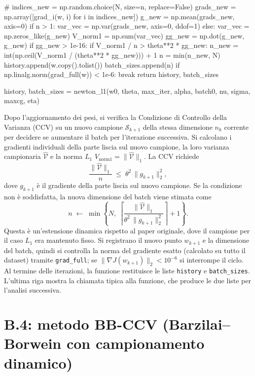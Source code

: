 \documentclass[italian, a4paper, twoside, binding=6mm]{sapthesis}
\begin{document}
\begin{pythoncode}[title= Newton-L1]

#
        indices_new = np.random.choice(N, size=n, replace=False)
        grads_new = np.array([grad_i(w, i) for i in indices_new])
        g_new = np.mean(grads_new, axis=0)
        if n > 1:
            var_vec = np.var(grads_new, axis=0, ddof=1)
        else:
            var_vec = np.zeros_like(g_new)
        V_norm1 = np.sum(var_vec)
        gg_new = np.dot(g_new, g_new)
        if gg_new > 1e-16:
            if V_norm1 / n > theta**2 * gg_new:
                n_new = int(np.ceil(V_norm1 / (theta**2 * gg_new))) + 1
                n = min(n_new, N)
        history.append(w.copy().tolist())
        batch_sizes.append(n)
        if np.linalg.norm(grad_full(w)) < 1e-6:
            break
    return history, batch_sizes

history, batch_sizes = newton_l1(w0, theta, max_iter, alpha, batch0, nu, sigma, maxcg, eta)
\end{pythoncode}
Dopo l'aggiornamento dei pesi, si verifica la Condizione di Controllo della Varianza (CCV) su un nuovo campione $\mathcal{S}_{k+1}$ della stessa dimensione $n_k$ corrente per decidere se aumentare il batch per l'iterazione successiva. Si calcolano i gradienti individuali della parte liscia sul nuovo campione, la loro varianza campionaria $\widehat{\mathcal{V}}$ e la norma $L_1$ $V_{\text{norm1}}=\|\widehat{\mathcal{V}}\|_1$. La CCV richiede
\[
\frac{\|\widehat{\mathcal{V}}\|_1}{n} \;\le\; \theta^2\,\|g_{k+1}\|_2^2,
\]
dove $g_{k+1}$ è il gradiente della parte liscia sul nuovo campione. Se la condizione non è soddisfatta, la nuova dimensione del batch viene stimata come
\[
n \;\leftarrow\; \min\!\left\{N,\;\left\lceil\frac{\|\widehat{\mathcal{V}}\|_1}{\theta^2\,\|g_{k+1}\|_2^2}\right\rceil+1\right\}.
\]
Questa è un'estensione dinamica rispetto al paper originale, dove il campione per il caso $L_1$ era mantenuto fisso. Si registrano il nuovo punto $w_{k+1}$ e la dimensione del batch, quindi si controlla la norma del gradiente esatto (calcolato su tutto il dataset) tramite \texttt{grad\_full}; se $\|\nabla J(w_{k+1})\|_2 < 10^{-6}$ si interrompe il ciclo. Al termine delle iterazioni, la funzione restituisce le liste \texttt{history} e \texttt{batch\_sizes}. L'ultima riga mostra la chiamata tipica alla funzione, che produce le due liste per l'analisi successiva.
\section{B.4: metodo BB-CCV (Barzilai--Borwein con campionamento dinamico)}
\end{document}

